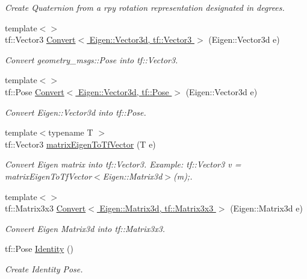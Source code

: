 \begin{DoxyCompactItemize}
\begin{DoxyCompactList}\small\item\em Create Quaternion from a rpy rotation representation designated in degrees. \end{DoxyCompactList}\item 
{\footnotesize template$<$$>$ }\\tf\-::\-Vector3 \hyperlink{namespaceConversion_a9628b6628e0a72b3e224861b45c1684e}{Convert$<$ Eigen\-::\-Vector3d, tf\-::\-Vector3 $>$} (Eigen\-::\-Vector3d e)
\begin{DoxyCompactList}\small\item\em Convert geometry\-\_\-msgs\-::\-Pose into tf\-::\-Vector3. \end{DoxyCompactList}\item 
{\footnotesize template$<$$>$ }\\tf\-::\-Pose \hyperlink{namespaceConversion_a467fb25355421f26061b723953096b71}{Convert$<$ Eigen\-::\-Vector3d, tf\-::\-Pose $>$} (Eigen\-::\-Vector3d e)
\begin{DoxyCompactList}\small\item\em Convert Eigen\-::\-Vector3d into tf\-::\-Pose. \end{DoxyCompactList}\item 
{\footnotesize template$<$typename T $>$ }\\tf\-::\-Vector3 \hyperlink{namespaceConversion_a897add416eb33b4d1f1a9e8d0977e07c}{matrix\-Eigen\-To\-Tf\-Vector} (T e)
\begin{DoxyCompactList}\small\item\em Convert Eigen matrix into tf\-::\-Vector3. Example\-: tf\-::\-Vector3 v = matrix\-Eigen\-To\-Tf\-Vector$<$\-Eigen\-::\-Matrix3d$>$(m);. \end{DoxyCompactList}\item 
{\footnotesize template$<$$>$ }\\tf\-::\-Matrix3x3 \hyperlink{namespaceConversion_a30a605b3e9c88baa3acce57268b8d9e2}{Convert$<$ Eigen\-::\-Matrix3d, tf\-::\-Matrix3x3 $>$} (Eigen\-::\-Matrix3d e)
\begin{DoxyCompactList}\small\item\em Convert Eigen Matrix3d into tf\-::\-Matrix3x3. \end{DoxyCompactList}\item 
tf\-::\-Pose \hyperlink{namespaceConversion_a6b311daa62f5258ff8682031bb6a4d7c}{Identity} ()
\begin{DoxyCompactList}\small\item\em Create Identity Pose. \end{DoxyCompactList}\item 

\end{DoxyCompactItemize}
